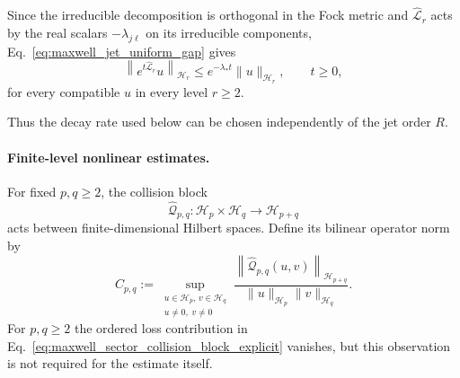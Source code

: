 \documentclass[11pt,oneside]{article}
\numberwithin{equation}{section}
\theoremstyle{definition}
\begin{document}
Since the irreducible decomposition is orthogonal in the Fock metric and
$\widehat{\mathcal L}_r$ acts by the real scalars
$-\lambda_{j\ell}$ on its irreducible components,
Eq.~\eqref{eq:maxwell_jet_uniform_gap} gives
\begin{equation}
\left\|
e^{t\widehat{\mathcal L}_r}u
\right\|_{\mathscr H_r}
\leq
e^{-\lambda_*t}
\|u\|_{\mathscr H_r},
\qquad
t\geq0,
\label{eq:maxwell_jet_semigroup_bound}
\end{equation}
for every compatible $u$ in every level $r\geq2$.

Thus the decay rate used below can be chosen independently of the jet
order $R$.

\paragraph{Finite-level nonlinear estimates.}

For fixed $p,q\geq2$, the collision block
\begin{equation}
\widehat{\mathcal Q}_{p,q}:
\mathscr H_p\times\mathscr H_q
\longrightarrow
\mathscr H_{p+q}
\end{equation}
acts between finite-dimensional Hilbert spaces.  Define its bilinear
operator norm by
\begin{equation}
C_{p,q}
:=
\sup_{\substack{u\in\mathscr H_p,\,
v\in\mathscr H_q\\u\neq0,\;v\neq0}}
\frac{
\left\|
\widehat{\mathcal Q}_{p,q}(u,v)
\right\|_{\mathscr H_{p+q}}
}{
\|u\|_{\mathscr H_p}
\|v\|_{\mathscr H_q}
}.
\label{eq:maxwell_jet_Cpq_def}
\end{equation}
For $p,q\geq2$ the ordered loss contribution in
Eq.~\eqref{eq:maxwell_sector_collision_block_explicit} vanishes, but this
observation is not required for the estimate itself.
\end{document}
